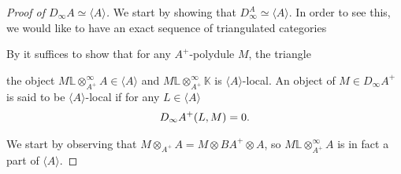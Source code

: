 \documentclass[../thesis.tex]{subfiles}
\begin{document}
            \begin{proof}[Proof of $D_\infty A \simeq \langle A \rangle$]
                We start by showing that $D_\infty^A \simeq \langle A \rangle$. In order to see this, we would like to have an exact sequence of triangulated categories
                \begin{center}
                \end{center}
                By \cite[Proposition 3.2.8][81]{Krause21} it suffices to show that for any $A^+$-polydule $M$, the triangle
                \begin{center}
                \end{center}
                the object $M \mathbb{L}\otimes_{A^+}^\infty A \in \langle A \rangle$ and $M \mathbb{L}\otimes_{A^+}^\infty \mathbb{K}$ is $\langle A \rangle$-local. An object of $M \in D_\infty A^+$ is said to be $\langle A \rangle$-local if for any $L \in \langle A \rangle$
                \begin{align*}
                    D_\infty A^+(L, M) = 0 \tt{.}
                \end{align*}

                We start by observing that $M \otimes_{A^+} A = M \otimes BA^+ \otimes A$, so $M \mathbb{L}\otimes_{A^+}^\infty A$ is in fact a part of $\langle A \rangle$.


\end{proof}
\end{document}
